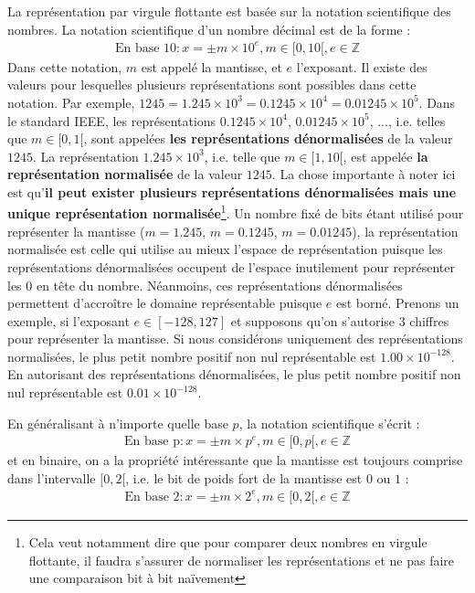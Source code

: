 La représentation par virgule flottante est basée sur la notation scientifique des nombres. La notation scientifique d'un nombre décimal est de la forme :
\begin{eqnarray*}
\mbox{En base 10} : x = \pm m \times 10^{e}, m \in [0, 10[, e \in \mathbb{Z} 
\end{eqnarray*}
Dans cette notation, $m$ est appelé la mantisse, et $e$ l'exposant. Il existe des valeurs pour lesquelles plusieurs représentations sont possibles dans cette notation. Par exemple, $1245 = 1.245 \times 10^3 = 0.1245 \times 10^4 = 0.01245 \times 10^5$. Dans le standard IEEE, les représentations $0.1245 \times 10^4$, $0.01245 \times 10^5$, ..., i.e. telles que $m \in [0, 1[$, sont appelées \textbf{les représentations dénormalisées} de la valeur $1245$. La représentation $1.245 \times 10^3$, i.e. telle que $m \in [1, 10[$, est appelée \textbf{la représentation normalisée} de la valeur $1245$. La chose importante à noter ici est qu'\textbf{il peut exister plusieurs représentations dénormalisées mais une unique représentation normalisée}\footnote{Cela veut notamment dire que pour comparer deux nombres en virgule flottante, il faudra s'assurer de normaliser les représentations et ne pas faire une comparaison bit à bit naïvement}. Un nombre fixé de bits étant utilisé pour représenter la mantisse ($m=1.245$, $m=0.1245$, $m=0.01245$), la représentation normalisée est celle qui utilise au mieux l'espace de représentation puisque les représentations dénormalisées occupent de l'espace inutilement pour représenter les $0$ en tête du nombre. Néanmoins, ces représentations dénormalisées permettent d'accroître le domaine représentable puisque $e$ est borné. Prenons un exemple, si l'exposant $e \in [-128, 127]$ et supposons qu'on s'autorise $3$ chiffres pour représenter la mantisse. Si nous considérons uniquement des représentations normalisées, le plus petit nombre positif non nul représentable est $1.00 \times 10^{-128}$. En autorisant des représentations dénormalisées, le plus petit nombre positif non nul représentable est $0.01 \times 10^{-128}$.


En généralisant à n'importe quelle base $p$, la notation scientifique s'écrit :
\begin{eqnarray*}
\mbox{En base p} : x = \pm m \times p^{e}, m \in [0, p[, e \in \mathbb{Z} 
\end{eqnarray*}
et en binaire, on a la propriété intéressante que la mantisse est toujours comprise dans l'intervalle $[0, 2[$, i.e. le bit de poids fort de la mantisse est $0$ ou $1$ :
\begin{eqnarray*}
\mbox{En base 2} : x = \pm m \times 2^{e}, m \in [0, 2[, e \in \mathbb{Z} 
\end{eqnarray*}

